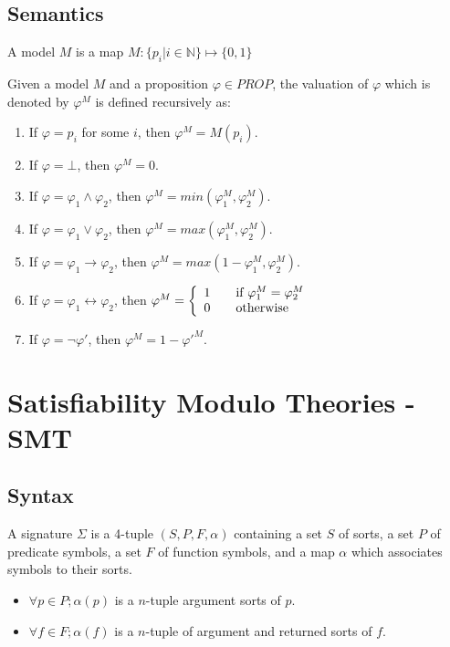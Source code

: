 \subsection{Semantics}
\begin{definition}
A model $M$ is a map $M : \{p_i | i \in \mathbb{N}\} \mapsto \{0, 1\}$
\end{definition}
\begin{definition} \label{def:pro-val}
Given a model $M$ and a proposition $\varphi \in PROP$, the valuation of $\varphi$ which is denoted by $\varphi^M$ is defined recursively as:
\begin{enumerate}
\item If $\varphi = p_i$ for some $i$, then $\varphi^M = M(p_i)$.
\item If $\varphi = \bot$, then $\varphi^M = 0$.
\item If $\varphi = \varphi_1 \wedge \varphi_2$, then $\varphi^M = min(\varphi_1^M,
 \varphi_2^M)$.
\item If $\varphi = \varphi_1 \vee \varphi_2$, then $\varphi^M = max(\varphi_1^M, \varphi_2^M)$.
\item If $\varphi = \varphi_1 \rightarrow \varphi_2$, then $\varphi^M = max(1 - \varphi_1^M, \varphi_2^M)$. 
\item If $\varphi = \varphi_1 \leftrightarrow \varphi_2$, then $\varphi^M = \left\{ 
  \begin{array}{c l}
    1 & \quad \text{if } \varphi_1^M = \varphi_2^M\\
    0 & \quad \text{otherwise }\\
  \end{array} \right.$
\item If $\varphi = \neg \varphi'$, then $\varphi^M = 1 - \varphi'^M$.
\end{enumerate}
\end{definition}

\section{Satisfiability Modulo Theories - SMT}
\subsection{Syntax} \label{subsection:smt-syntax}
\begin{definition}
A signature $\Sigma$ is a 4-tuple $(S, P, F, \alpha)$ containing a set $S$ of sorts, a set $P$ of predicate symbols, a set $F$ of function symbols, and a map $\alpha$ which associates symbols to their sorts.
\begin{itemize}
\item $\forall p \in P; \alpha(p)$ is a $n$-tuple argument sorts of $p$.
\item $\forall f \in F; \alpha(f)$ is a $n$-tuple of argument and returned sorts of $f$.
\end{itemize}
\end{definition}


